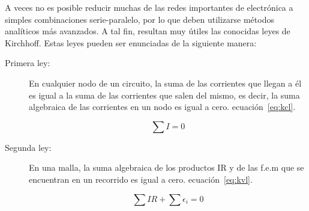 \documentclass[12pt, a4paper]{article}
\begin{document}
A veces no es posible reducir muchas de las redes importantes de electrónica a simples combinaciones serie-paralelo, 
por lo que deben utilizarse métodos analíticos más avanzados. A tal fin, resultan muy útiles las conocidas leyes de 
Kirchhoff. Estas leyes pueden ser enunciadas de la siguiente manera:
\begin{description}
    \item[Primera ley:] En cualquier nodo de un circuito, la suma de las corrientes que llegan a él es igual a la 
    suma de las corrientes que salen del mismo, es decir, la suma algebraica de las corrientes en un nodo es igual 
    a cero. ecuación~\eqref{eq:kcl}.

    \begin{equation}
        \sum I = 0
        \label{eq:kcl}
    \end{equation}

    \item[Segunda ley:] En una malla, la suma algebraica de los productos IR y de las f.e.m que se encuentran en un 
    recorrido es igual a cero. ecuación~\eqref{eq:kvl}.

    \begin{equation}
        \sum IR + \sum \epsilon_i = 0
        \label{eq:kvl}
\end{equation}

\end{description}
\end{document}
